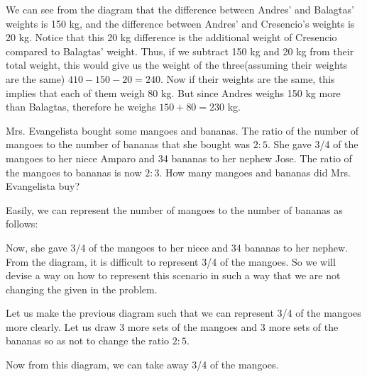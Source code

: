 \begin{example}
We can see from the diagram that the difference between Andres' and Balagtas' weights is 150 kg,
and the difference between Andres' and Cresencio's weights is 20 kg. Notice that this 20 kg
difference is the additional weight of Cresencio compared to Balagtas' weight. Thus, if we subtract
150 kg and 20 kg from their total weight, this would give us the weight of the three(assuming their
weights are the same) $410 - 150 - 20 = 240$. Now if their weights are the same, this implies that
each of them weigh 80 kg. But since Andres weighs 150 kg more than Balagtas, therefore he weighs
$150 + 80 = 230$ kg.

\Item Mrs. Evangelista bought some mangoes and bananas. The ratio of the number of mangoes
to the number of bananas that she bought was $2:5$. She gave 3/4 of the mangoes to her niece Amparo
and 34 bananas to her nephew Jose. The ratio of the mangoes to bananas is now $2:3$. How many
mangoes and bananas did Mrs. Evangelista buy?

Easily, we can represent the number of mangoes to the number of bananas as follows:


Now, she gave 3/4 of the mangoes to her niece and 34 bananas to her nephew. From the diagram, it is
difficult to represent 3/4 of the mangoes. So we will devise a way on how to represent this scenario in
such a way that we are not changing the given in the problem.

\Item Let us make the previous diagram such that we can represent 3/4 of the mangoes more clearly. Let us
draw 3 more sets of the mangoes and 3 more sets of the bananas so as not to change the ratio $2:5$.


Now from this diagram, we can take away 3/4 of the mangoes.


\end{example}

